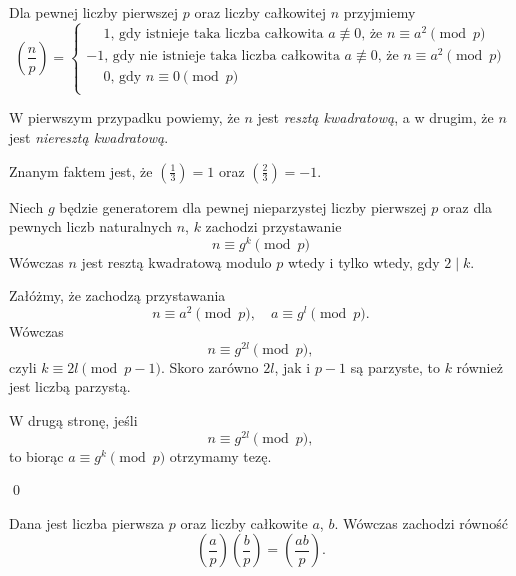 \newpage


\noindent
Dla pewnej liczby pierwszej $p$ oraz liczby całkowitej $n$ przyjmiemy
\[
	\left(\frac{n}{p}\right) = 
	\begin{cases}
		\phantom{-}1 \text{, gdy istnieje taka liczba całkowita } a \not\equiv 0 \text{, że } n \equiv a^2 \pmod{p}\\
		-1\text{, gdy nie istnieje taka liczba całkowita } a \not\equiv 0 \text{, że } n \equiv a^2 \pmod{p} \\
		\phantom{-}0 \text{, gdy } n \equiv 0 \pmod{p}\\
	\end{cases}
\]

\noindent
W pierwszym przypadku powiemy, że $n$ jest \textit{resztą kwadratową}, a w drugim, że $n$ jest \textit{nieresztą kwadratową}.

\vspace{10px}
\noindent
Znanym faktem jest, że $\left(\frac{1}{3}\right) = 1$ oraz $\left(\frac{2}{3}\right) = -1$.

\vspace{10px}


\noindent
Niech $g$ będzie generatorem dla pewnej nieparzystej liczby pierwszej $p$ oraz dla pewnych liczb naturalnych $n$, $k$ zachodzi przystawanie
\[
	n \equiv g^k \pmod{p}
\] 
Wówczas $n$ jest resztą kwadratową modulo $p$ wtedy i tylko wtedy, gdy $2 \mid k$.

\vspace{5px}


\noindent
Załóżmy, że zachodzą przystawania
\[
	n \equiv a^2 \pmod{p}, \quad a \equiv g^l \pmod{p}.
\]
Wówczas
\[
	n \equiv g^{2l} \pmod{p},
\]
czyli $k \equiv 2l \pmod{p - 1}$. Skoro zarówno $2l$, jak i $p - 1$ są parzyste, to $k$ również jest liczbą parzystą.

\vspace{10px}
\noindent
W drugą stronę, jeśli
\[
	n \equiv g^{2l} \pmod{p},
\]
to biorąc $a \equiv g^k \pmod{p}$ otrzymamy tezę.

\qed
\vspace{10px}


\noindent
Dana jest liczba pierwsza $p$ oraz liczby całkowite $a$, $b$. Wówczas zachodzi równość
\[
	\left(\frac{a}{p}\right)\left(\frac{b}{p}\right) = \left(\frac{ab}{p}\right).
\]

